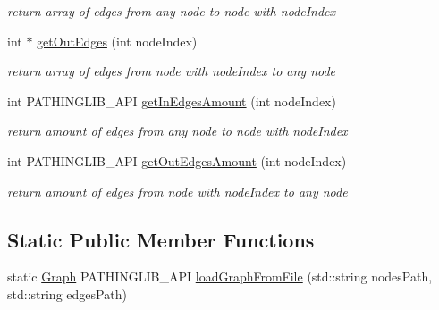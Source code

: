 \begin{DoxyCompactItemize}
\begin{DoxyCompactList}\small\item\em return array of edges from any node to node with node\+Index \end{DoxyCompactList}\item 
int $\ast$ \hyperlink{class_pathing_lib_1_1_graph_ac5e9c0410ba1ea6b14e34b43526dd439}{get\+Out\+Edges} (int node\+Index)\hypertarget{class_pathing_lib_1_1_graph_ac5e9c0410ba1ea6b14e34b43526dd439}{}\label{class_pathing_lib_1_1_graph_ac5e9c0410ba1ea6b14e34b43526dd439}

\begin{DoxyCompactList}\small\item\em return array of edges from node with node\+Index to any node \end{DoxyCompactList}\item 
int P\+A\+T\+H\+I\+N\+G\+L\+I\+B\+\_\+\+A\+PI \hyperlink{class_pathing_lib_1_1_graph_a639c91136dd7ff88a9627b2ad355df11}{get\+In\+Edges\+Amount} (int node\+Index)\hypertarget{class_pathing_lib_1_1_graph_a639c91136dd7ff88a9627b2ad355df11}{}\label{class_pathing_lib_1_1_graph_a639c91136dd7ff88a9627b2ad355df11}

\begin{DoxyCompactList}\small\item\em return amount of edges from any node to node with node\+Index \end{DoxyCompactList}\item 
int P\+A\+T\+H\+I\+N\+G\+L\+I\+B\+\_\+\+A\+PI \hyperlink{class_pathing_lib_1_1_graph_ad0972ca21a8db914fd3d607f0b19b6c4}{get\+Out\+Edges\+Amount} (int node\+Index)\hypertarget{class_pathing_lib_1_1_graph_ad0972ca21a8db914fd3d607f0b19b6c4}{}\label{class_pathing_lib_1_1_graph_ad0972ca21a8db914fd3d607f0b19b6c4}

\begin{DoxyCompactList}\small\item\em return amount of edges from node with node\+Index to any node \end{DoxyCompactList}\end{DoxyCompactItemize}
\subsection*{Static Public Member Functions}
\begin{DoxyCompactItemize}
\item 
static \hyperlink{class_pathing_lib_1_1_graph}{Graph} P\+A\+T\+H\+I\+N\+G\+L\+I\+B\+\_\+\+A\+PI \hyperlink{class_pathing_lib_1_1_graph_ae249930c9e63f8f118e66589cf1ca12a}{load\+Graph\+From\+File} (std\+::string nodes\+Path, std\+::string edges\+Path)
\end{DoxyCompactItemize}


